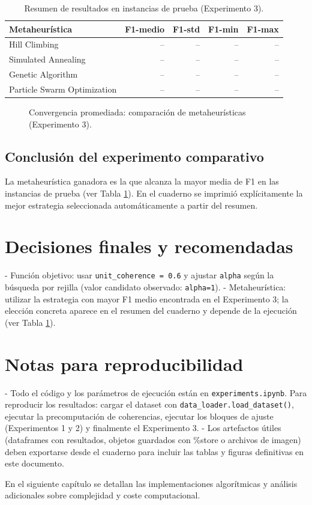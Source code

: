 \begin{table}[ht]
  \centering
  \caption{Resumen de resultados en instancias de prueba (Experimento 3).}
  \label{tab:exp3_summary}
  \begin{tabular}{lrrrr}
    \toprule
    Metaheurística & F1-medio & F1-std & F1-min & F1-max \\
    \midrule
    Hill Climbing & -- & -- & -- & -- \\
    Simulated Annealing & -- & -- & -- & -- \\
    Genetic Algorithm & -- & -- & -- & -- \\
    Particle Swarm Optimization & -- & -- & -- & -- \\
    \bottomrule
  \end{tabular}
\end{table}

\begin{figure}[ht]
  \centering
  \caption{Convergencia promediada: comparación de metaheurísticas (Experimento 3).}
  \label{fig:convergence_compare}
\end{figure}

\subsection{Conclusión del experimento comparativo}
La metaheurística ganadora es la que alcanza la mayor media de F1 en las instancias de prueba (ver Tabla \ref{tab:exp3_summary}). En el cuaderno se imprimió explícitamente la mejor estrategia seleccionada automáticamente a partir del resumen.

\section{Decisiones finales y recomendadas}
- Función objetivo: usar \texttt{unit\_coherence = 0.6} y ajustar \texttt{alpha} según la búsqueda por rejilla (valor candidato observado: \texttt{alpha=1}).
- Metaheurística: utilizar la estrategia con mayor F1 medio encontrada en el Experimento 3; la elección concreta aparece en el resumen del cuaderno y depende de la ejecución (ver Tabla \ref{tab:exp3_summary}).

\section{Notas para reproducibilidad}
- Todo el código y los parámetros de ejecución están en \texttt{experiments.ipynb}. Para reproducir los resultados: cargar el dataset con \texttt{data_loader.load_dataset()}, ejecutar la precomputación de coherencias, ejecutar los bloques de ajuste (Experimentos 1 y 2) y finalmente el Experimento 3.
- Los artefactos útiles (dataframes con resultados, objetos guardados con \%store o archivos de imagen) deben exportarse desde el cuaderno para incluir las tablas y figuras definitivas en este documento.

\vspace{2mm}
En el siguiente capítulo se detallan las implementaciones algorítmicas y análisis adicionales sobre complejidad y coste computacional.
